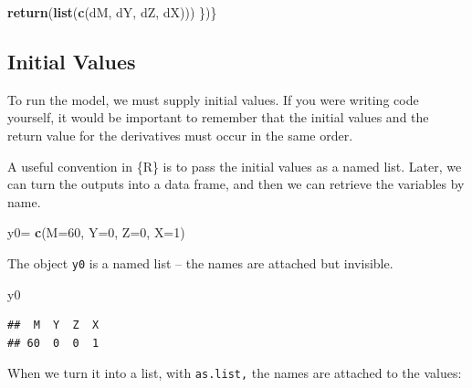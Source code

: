 \documentclass[
]{book}
\newenvironment{Shaded}{\begin{snugshade}}{\end{snugshade}}
\newcommand{\AttributeTok}[1]{\textcolor[rgb]{0.13,0.29,0.53}{#1}}
\newcommand{\DecValTok}[1]{\textcolor[rgb]{0.00,0.00,0.81}{#1}}
\newcommand{\FunctionTok}[1]{\textcolor[rgb]{0.13,0.29,0.53}{\textbf{#1}}}
\newcommand{\NormalTok}[1]{#1}
\newcommand{\OtherTok}[1]{\textcolor[rgb]{0.56,0.35,0.01}{#1}}
\newcommand{\SpecialCharTok}[1]{\textcolor[rgb]{0.81,0.36,0.00}{\textbf{#1}}}
\begin{document}
\begin{Shaded}
\begin{Highlighting}[]
  \FunctionTok{return}\NormalTok{(}\FunctionTok{list}\NormalTok{(}\FunctionTok{c}\NormalTok{(dM, dY, dZ, dX)))}
\NormalTok{\})\} }
\end{Highlighting}
\end{Shaded}

\hypertarget{initial-values}{%
\subsection{Initial Values}\label{initial-values}}

To run the model, we must supply initial values. If you were writing code yourself, it would be important to remember that the initial values and the return value for the derivatives must occur in the same order.

A useful convention in \{R\} is to pass the initial values as a named list. Later, we can turn the outputs into a data frame, and then we can retrieve the variables by name.

\begin{Shaded}
\begin{Highlighting}[]
\NormalTok{y0}\OtherTok{=} \FunctionTok{c}\NormalTok{(}\AttributeTok{M=}\DecValTok{60}\NormalTok{, }\AttributeTok{Y=}\DecValTok{0}\NormalTok{, }\AttributeTok{Z=}\DecValTok{0}\NormalTok{, }\AttributeTok{X=}\DecValTok{1}\NormalTok{)}
\end{Highlighting}
\end{Shaded}

The object \texttt{y0} is a named list -- the names are attached but invisible.

\begin{Shaded}
\begin{Highlighting}[]
\NormalTok{y0}
\end{Highlighting}
\end{Shaded}

\begin{verbatim}
##  M  Y  Z  X 
## 60  0  0  1
\end{verbatim}

When we turn it into a list, with \texttt{as.list,} the names are attached to the values:

\begin{Shaded}
\end{Shaded}
\end{document}

